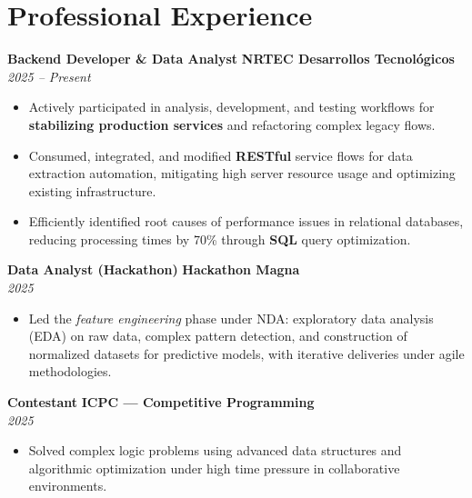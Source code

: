 \documentclass[10pt,a4paper]{article}
\begin{document}
\section{Professional Experience}

\noindent\textbf{Backend Developer \& Data Analyst} \hfill \textbf{NRTEC Desarrollos Tecnológicos} \\
\textit{2025 -- Present}
\begin{itemize}[leftmargin=*,nosep,after=\vspace{0.05em},itemsep=0pt]
  \item Actively participated in analysis, development, and testing workflows for \textbf{stabilizing production services} and refactoring complex legacy flows.
  \item Consumed, integrated, and modified \textbf{RESTful} service flows for data extraction automation, mitigating high server resource usage and optimizing existing infrastructure.
  \item Efficiently identified root causes of performance issues in relational databases, reducing processing times by 70\% through \textbf{SQL} query optimization.
\end{itemize}

\noindent\textbf{Data Analyst (Hackathon)} \hfill \textbf{Hackathon Magna} \\
\textit{2025}
\begin{itemize}[leftmargin=*,nosep,after=\vspace{0.05em},itemsep=0pt]
  \item Led the \textit{feature engineering} phase under NDA: exploratory data analysis (EDA) on raw data, complex pattern detection, and construction of normalized datasets for predictive models, with iterative deliveries under agile methodologies.
\end{itemize}

\noindent\textbf{Contestant} \hfill \textbf{ICPC --- Competitive Programming} \\
\textit{2025}
\begin{itemize}[leftmargin=*,nosep,after=\vspace{0.05em},itemsep=0pt]
  \item Solved complex logic problems using advanced data structures and algorithmic optimization under high time pressure in collaborative environments.
\end{itemize}

\end{document}
